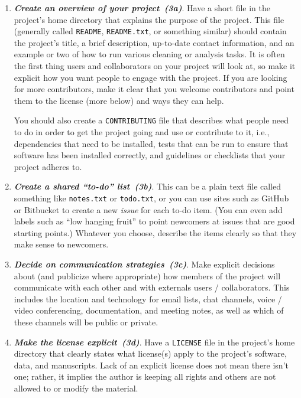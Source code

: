 \documentclass[10pt,letterpaper]{article}
\newcommand{\practice}[2]{\textbf{\emph{{#2}~({#1})}}}
\begin{document}
\begin{enumerate}

\item

  \practice{3a}{Create an overview of your project}.  Have a short
  file in the project's home directory that explains the purpose of
  the project.  This file (generally called \texttt{README},
  \texttt{README.txt}, or something similar) should contain the
  project's title, a brief description, up-to-date contact
  information, and an example or two of how to run various cleaning or
  analysis tasks.  It is often the first thing users and collaborators
  on your project will look at, so make it explicit how you want
  people to engage with the project. If you are looking for more
  contributors, make it clear that you welcome contributors and
  point them to the license (more below) and ways they can help.

  You should also create a \texttt{CONTRIBUTING} file that describes
  what people need to do in order to get the project going and use or
  contribute to it, i.e., dependencies that need to be installed,
  tests that can be run to ensure that software has been installed
  correctly, and guidelines or checklists that your project adheres
  to.

\item

  \practice{3b}{Create a shared ``to-do'' list}.  This can be a plain
  text file called something like \texttt{notes.txt} or
  \texttt{todo.txt}, or you can use sites such as GitHub or Bitbucket
  to create a new \emph{issue} for each to-do item. (You can even add
  labels such as ``low hanging fruit'' to point newcomers at issues
  that are good starting points.)  Whatever you choose, describe the
  items clearly so that they make sense to newcomers.

\item

  \practice{3c}{Decide on communication strategies}. Make explicit
  decisions about (and publicize where appropriate) how members of the
  project will communicate with each other and with externals users /
  collaborators. This includes the location and technology for email
  lists, chat channels, voice / video conferencing, documentation, and
  meeting notes, as well as which of these channels will be public or
  private.

\item

  \practice{3d}{Make the license explicit}. Have a \texttt{LICENSE}
  file in the project's home directory that clearly states what
  license(s) apply to the project's software, data, and
  manuscripts. Lack of an explicit license does not mean there isn't
  one; rather, it implies the author is keeping all rights and others
  are not allowed to  or modify the material.


\end{enumerate}
\end{document}
